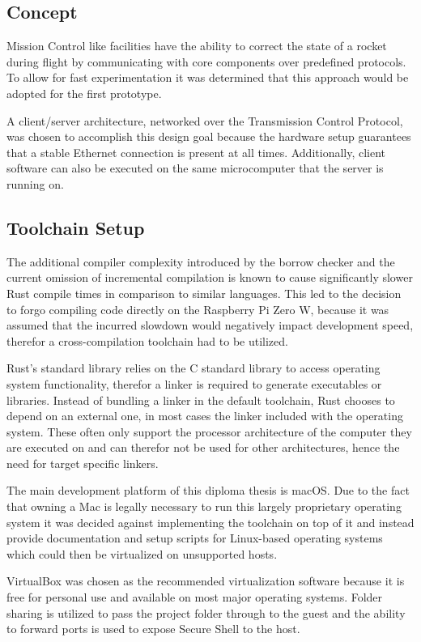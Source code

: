 \subsection{Concept}
Mission Control like facilities have the ability to correct the state of a rocket during flight by communicating with core components over predefined protocols. To allow for fast experimentation it was determined that this approach would be adopted for the first prototype.

A client/server architecture, networked over the Transmission Control Protocol, was chosen to accomplish this design goal because the hardware setup guarantees that a stable Ethernet connection is present at all times. Additionally, client software can also be executed on the same microcomputer that the server is running on.

\subsection{Toolchain Setup}
The additional compiler complexity introduced by the borrow checker and the current omission of incremental compilation is known to cause significantly slower Rust compile times in comparison to similar languages. This led to the decision to forgo compiling code directly on the Raspberry Pi Zero W, because it was assumed that the incurred slowdown would negatively impact development speed, therefor a cross-compilation toolchain had to be utilized.

Rust's standard library relies on the C standard library to access operating system functionality, therefor a linker is required to generate executables or libraries. Instead of bundling a linker in the default toolchain, Rust chooses to depend on an external one, in most cases the linker included with the operating system. These often only support the processor architecture of the computer they are executed on and can therefor not be used for other architectures, hence the need for target specific linkers.

The main development platform of this diploma thesis is macOS. Due to the fact that owning a Mac is legally necessary to run this largely proprietary operating system it was decided against implementing the toolchain on top of it and instead provide documentation and setup scripts for Linux-based operating systems which could then be virtualized on unsupported hosts. 

VirtualBox was chosen as the recommended virtualization software because it is free for personal use and available on most major operating systems. Folder sharing is utilized to pass the project folder through to the guest and the ability to forward ports is used to expose Secure Shell to the host.

